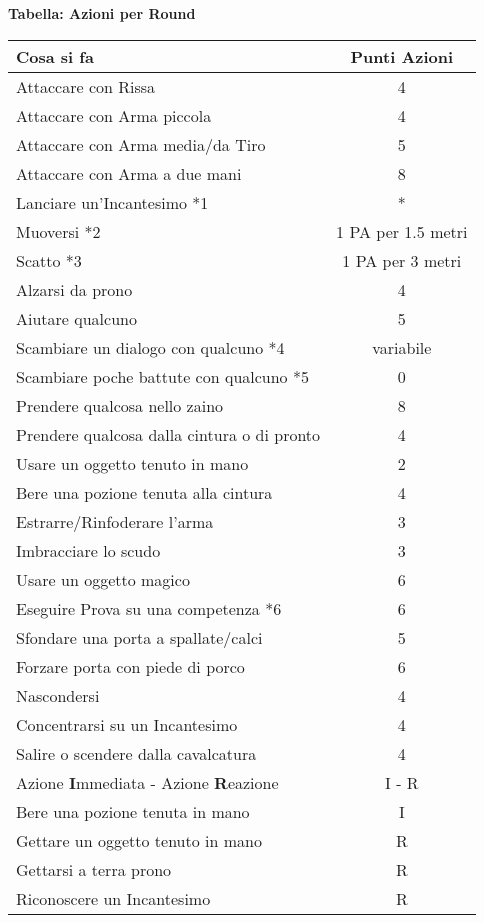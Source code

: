 \documentclass[12pt,a4paper,twoside,openany]{book}
\begin{document}
\textbf{Tabella: Azioni per Round}



\begin{tabularx}{0.95\textwidth}{Xc}
\textbf{Cosa si fa}  & \textbf{Punti Azioni}\\
\toprule
Attaccare con Rissa					& 4\\
Attaccare con Arma piccola			& 4\\
Attaccare con Arma media/da Tiro	& 5\\
Attaccare con Arma a due mani		& 8\\
Lanciare un'Incantesimo *1			& *\\
Muoversi *2							& 1 PA per 1.5 metri\\
Scatto *3							& 1 PA per 3 metri\\
Alzarsi da prono					& 4\\
Aiutare qualcuno					& 5\\
Scambiare un dialogo con qualcuno *4	& variabile\\
Scambiare poche battute con qualcuno *5& 0\\
Prendere qualcosa nello zaino		& 8\\
Prendere qualcosa dalla cintura o di pronto & 4\\
Usare un oggetto tenuto in mano		& 2\\
Bere una pozione tenuta alla cintura& 4\\
Estrarre/Rinfoderare l'arma			& 3\\
Imbracciare lo scudo				& 3\\
Usare un oggetto magico				& 6\\
Eseguire Prova su una competenza *6	& 6\\
Sfondare una porta a spallate/calci	& 5\\
Forzare porta con piede di porco	& 6\\
Nascondersi							& 4\\
Concentrarsi su un Incantesimo		& 4\\
Salire o scendere dalla cavalcatura	& 4\\
Azione \textbf{I}mmediata - Azione \textbf{R}eazione& I - R\\
Bere una pozione tenuta in mano& I\\
Gettare un oggetto tenuto in mano& R\\
Gettarsi a terra prono& R\\
Riconoscere un Incantesimo& R\\
\end{tabularx}
\end{document}
